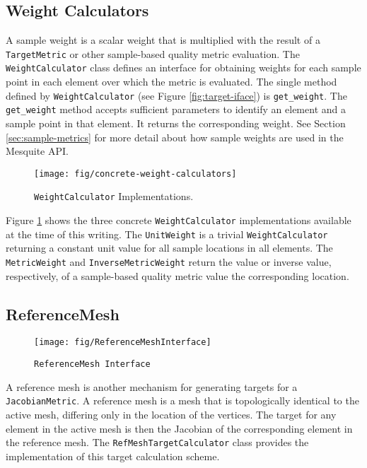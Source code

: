 \documentclass{article}
\begin{document}
\subsection{Weight Calculators}

A sample weight is a scalar weight that is multiplied with the result of a \texttt{TargetMetric} or other sample-based quality metric evaluation.  The \texttt{WeightCalculator} class defines an interface for obtaining weights for each sample point in each element over which the metric is evaluated.  The single method defined by \texttt{WeightCalculator} (see Figure \ref{fig:target-iface}) is \texttt{get\_weight}.  The \texttt{get\_weight} method accepts sufficient parameters to identify an element and a sample point in that element.  It returns the corresponding weight.  See Section \ref{sec:sample-metrics} for more detail about how sample weights are used in the Mesquite API.

\begin{figure}[htb]
\begin{center}
\texttt{[image: fig/concrete-weight-calculators]}
\caption{\texttt{WeightCalculator} Implementations.\label{fig:weight-concrete}}
\end{center}
\end{figure}

Figure \ref{fig:weight-concrete} shows the three concrete \texttt{WeightCalculator} implementations available at the time of this writing.  The \texttt{UnitWeight} is a trivial \texttt{WeightCalculator} returning a constant unit value for all sample locations in all elements.  The \texttt{MetricWeight} and \texttt{InverseMetricWeight} return the value or inverse value, respectively, of a sample-based quality metric value the corresponding location.

\subsection{ReferenceMesh}
\label{sec:RefMesh}

\begin{figure}[htb]
\begin{center}
\texttt{[image: fig/ReferenceMeshInterface]}
\caption{\texttt{ReferenceMesh Interface}\label{fig:refmeshiface}}
\end{center}
\end{figure}

A reference mesh is another mechanism for generating targets for a \texttt{JacobianMetric}.  A reference mesh is a mesh that is topologically identical to the active mesh, differing only in the location of the vertices.  The target for any element in the active mesh is then the Jacobian of the corresponding element in the reference mesh.  The \texttt{RefMeshTargetCalculator} class provides the implementation of this target calculation scheme.  
\end{document}
